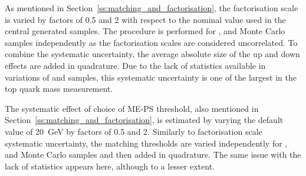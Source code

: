 \begin{description}[wide=\parindent]

\item [Factorisation scale.]
As mentioned in Section~\ref{ss:matching_and_factorisation}, the factorisation scale is varied by factors of 0.5 and 2
with respect to the nominal value used in the central generated samples. The procedure is performed for \ttjets, \WpJets
and \ZpJets Monte Carlo samples independently as the factorisation scales are considered uncorrelated. To combine the
systematic uncertainty, the average absolute size of the up and down effects are added in quadrature. Due to the lack of
statistics available in variations of \WpJets and \ZpJets samples, this systematic uncertainty is one of the largest in
the top quark mass measurement.


\item [ME-PS matching threshold.]
The systematic effect of choice of ME-PS threshold, also mentioned in Section~\ref{ss:matching_and_factorisation}, is
estimated by varying the default value of \SI{20}{\GeV} by factors of 0.5 and 2. Similarly to factorisation scale
systematic uncertainty, the matching thresholds are varied independently for \ttjets, \WpJets and \ZpJets Monte Carlo
samples and then added in quadrature. The same issue with the lack of statistics appears here, although to a lesser
extent.


\end{description}
